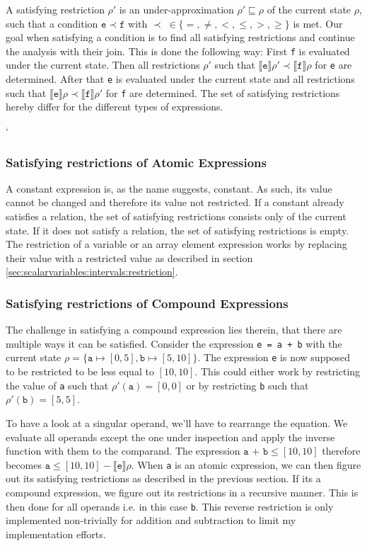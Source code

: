 A satisfying restriction $\rho'$ is an under-approximation $\rho'\sqsubseteq\rho$ of the current state $\rho$, such that a condition $\mathtt{e}\prec\mathtt{f}$ with $\prec \;\in \{=,\neq,<,\leq,>,\geq\}$ is met. Our goal when satisfying a condition is to find all satisfying restrictions and continue the analysis with their join. This is done the following way: First \texttt{f} is evaluated under the current state. Then all restrictions $\rho'$ such that $\llbracket\mathtt{e}\rrbracket\rho'\prec\llbracket\mathtt{f}\rrbracket\rho$ for \texttt{e} are determined. After that \texttt{e} is evaluated under the current state and all restrictions such that $\llbracket\mathtt{e}\rrbracket\rho\prec\llbracket\mathtt{f}\rrbracket\rho'$ for \texttt{f} are determined. The set of satisfying restrictions hereby differ for the different types of expressions.

`
\subsubsection{Satisfying restrictions of Atomic Expressions}

A constant expression is, as the name suggests, constant. As such, its value cannot be changed and therefore its value not restricted. If a constant already satisfies a relation, the set of satisfying restrictions consists only of the current state. If it does not satisfy a relation, the set of satisfying restrictions is empty. The restriction of a variable or an array element expression works by replacing their value with a restricted value as described in section \ref{sec:scalarvariables:intervals:restriction}. 

\subsubsection{Satisfying restrictions of Compound Expressions}

The challenge in satisfying a compound expression lies therein, that there are multiple ways it can be satisfied. Consider the expression \texttt{e = a + b} with the current state $\rho=\{\mathtt{a}\mapsto[0,5],\mathtt{b}\mapsto[5,10]\}$. The expression \texttt{e} is now supposed to be restricted to be less equal to $[10,10]$. This could either work by restricting the value of \texttt{a} such that $\rho'(\mathtt{a})=[0,0]$ or by restricting \texttt{b} such that $\rho'(\mathtt{b})=[5,5]$.

To have a look at a singular operand, we'll have to rearrange the equation. We evaluate all operands except the one under inspection and apply the inverse function with them to the comparand. The expression $\texttt{a + b} \leq [10,10]$ therefore becomes $\texttt{a} \leq [10,10] - \llbracket\texttt{e}\rrbracket\rho$. When \texttt{a} is an atomic expression, we can then figure out its satisfying restrictions as described in the previous section. If its a compound expression, we figure out its restrictions in a recursive manner. This is then done for all operands i.e. in this case \texttt{b}. This reverse restriction is only implemented non-trivially for addition and subtraction to limit my implementation efforts. 

